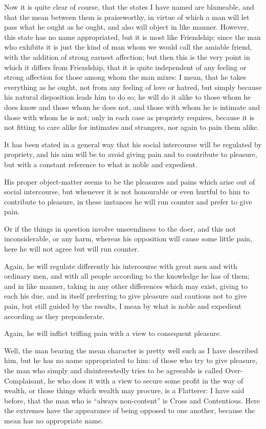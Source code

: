 Now it is quite clear of course, that the states I have named are blameable,
and that the mean between them is praiseworthy, in virtue of which a man will
let pass what he ought as he ought, and also will object in like manner.
However, this state has no name appropriated, but it is most like Friendship;
since the man who exhibits it is just the kind of man whom we would call the
amiable friend, with the addition of strong earnest affection; but then this is
the very point in which it differs from Friendship, that it is quite
independent of any feeling or strong affection for those among whom the man
mixes: I mean, that he takes everything as he ought, not from any feeling of
love or hatred, but simply because his natural disposition leads him to do so;
he will do it alike to those whom he does know and those whom he does not, and
those with whom he is intimate and those with whom he is not; only in each case
as propriety requires, because it is not fitting to care alike for intimates
and strangers, nor again to pain them alike.

It has been stated in a general way that his social intercourse will be
regulated by propriety, and his aim will be to avoid giving pain and to
contribute to pleasure, but with a constant reference to what is noble and
expedient.

His proper object-matter seems to be the pleasures and pains which arise out of
social intercourse, but whenever it is not honourable or even hurtful to him to
contribute to pleasure, in these instances he will run counter and prefer to
give pain.

Or if the things in question involve unseemliness to the doer, and this not
inconsiderable, or any harm, whereas his opposition will cause some little
pain, here he will not agree but will run counter.

Again, he will regulate differently his intercourse with great men and with
ordinary men, and with all people according to the knowledge he has of them;
and in like manner, taking in any other differences which may exist, giving to
each his due, and in itself preferring to give pleasure and cautious not to
give pain, but still guided by the results, I mean by what is noble and
expedient according as they preponderate.

Again, he will inflict trifling pain with a view to consequent pleasure.

Well, the man bearing the mean character is pretty well such as I have
described him, but he has no name appropriated to him: of those who try to give
pleasure, the man who simply and disinterestedly tries to be agreeable is
called Over-Complaisant, he who does it with a view to secure some profit in
the way of wealth, or those things which wealth may procure, is a Flatterer: I
have said before, that the man who is “always non-content” is Cross
and Contentious. Here the extremes have the appearance of being opposed to one
another, because the mean has no appropriate name.

